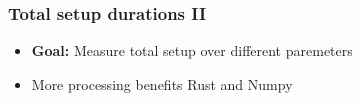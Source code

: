 \documentclass[t,english]{beamer}
\begin{document}
\begin{frame}
  \frametitle{Total setup durations II}
  \begin{itemize}
    \item \textbf{Goal:} Measure total setup over different paremeters
  \end{itemize}
  \begin{itemize}
    \item<2->  More processing benefits Rust and Numpy
  \end{itemize}
\end{frame}
\end{document}
